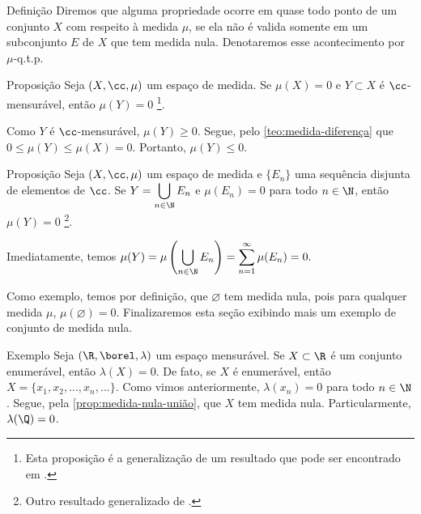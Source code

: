 \begin{env}{Definição}
	\label{def:quase-todo-ponto}
	Diremos que alguma propriedade ocorre em quase todo ponto de um conjunto $X$ com respeito à medida $\mu$, se ela não é valida somente em um subconjunto $E$ de $X$ que tem medida nula.
	Denotaremos esse acontecimento por $\mu$-q.t.p.
\end{env}

\begin{env}{Proposição}
	\label{prop:medida-nula-subconjunto}
	Seja $(X, \cc, \mu)$ um espaço de medida.
	Se $\mu(X) = 0$ e $Y \subset X$ é $\cc$-mensurável, então $\mu(Y) = 0$ \footnote{
		Esta proposição é a generalização de um resultado que pode ser encontrado em \cite[p.343]{elon}.
		}.
\end{env}
\begin{prova}
	Como $Y$ é $\cc$-mensurável, $\mu(Y)\geq 0$.
	Segue, pelo \ref{teo:medida-diferença} que
	$
	0 \leq \mu(Y) \leq \mu(X) = 0
	$.
	Portanto, $\mu(Y) \leq 0$.
	\vspace{-0.4cm}
\end{prova}

\begin{env}{Proposição}
	\label{prop:medida-nula-união}
	Seja $(X, \cc, \mu)$ um espaço de medida e $\{E_n\}$ uma sequência disjunta de elementos de $\cc$.
	Se $Y = \displaystyle\bigcup_{n \in \N}E_n$ e $\mu(E_n) = 0$ para todo $n \in \N$, então $\mu(Y) = 0$
	\footnote{
		Outro resultado generalizado de \cite[p.343]{elon}.
		}.
\end{env}
\begin{prova}
	Imediatamente, temos
	$\displaystyle
	\mu(Y)
	=
	\mu\left(\bigcup_{n \in \N}E_n\right)
	=
	\sum_{n = 1}^\infty \mu(E_n)
	= 0.
	$
\end{prova}

Como exemplo, temos por definição, que $\varnothing$ tem medida nula, pois para qualquer medida $\mu$, $\mu(\varnothing) = 0$.
Finalizaremos esta seção exibindo mais um exemplo de conjunto de medida nula.

\begin{env}{Exemplo}
	Seja $(\R, \borel, \lambda)$ um espaço mensurável.
	Se $X \subset \R$ é um conjunto enumerável, então $\lambda(X) = 0$.
	De fato, se $X$ é enumerável, então
	$X = \{x_1,x_2, ..., x_n,...\}$.
	Como vimos anteriormente, $\lambda(x_n) = 0$ para todo $n \in \N$.
	Segue, pela \ref{prop:medida-nula-união}, que
	$X$ tem medida nula.
	Particularmente, 
	$\lambda(\Q) = 0$.
\end{env}
